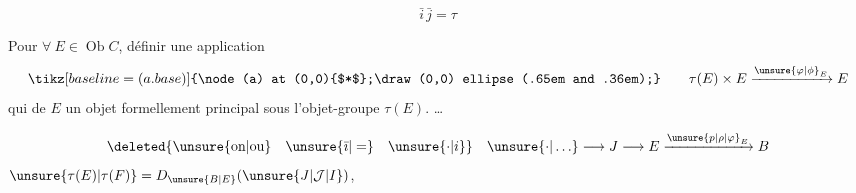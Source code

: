 \[
 \bar i\,\bar j=\tau
\]

Pour $\forall\ E\in\operatorname{Ob}C$,  définir une application
\[
 \tikz[baseline=(a.base)]{\node(a) at (0,0){$*$};\draw (0,0) ellipse (.65em and .36em);}\qquad
 \tau(E)\times E\xrightarrow{{\unsure{\varphi|\phi}}_{E}}E
\]
qui  de $E$ un objet formellement principal sous l'objet-groupe $\tau(E)$.    \ldots

\[
 \deleted{\text{\unsure{on|ou}}\quad\unsure{\bar{\imath}|=}\quad\unsure{\cdot|i}}\quad
 \unsure{\cdot|\ldots}\longrightarrow{J}\longrightarrow E\xrightarrow{{\unsure{p|\rho|\varphi}}_{E}}B
\]
 $\unsure{\tau(E)|\tau(F)}=D_{\unsure{B|E}}(\unsure{J|\mathcal{J}|I})$,
